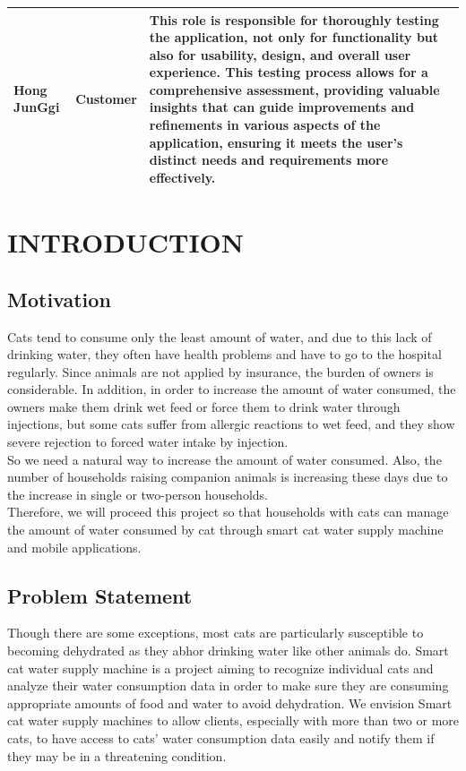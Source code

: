 \documentclass[conference]{IEEEtran}
\begin{document}
\newpage
\begin{table}[htbp!]\normalsize
\begin{center}
\begin{tabular}{|p{1.2cm}|p{1.9cm}|p{4.5cm}|}
\hline
Hong JunGgi & Customer &
This role is responsible for thoroughly testing the application, not only for functionality but also for usability, design, and overall user experience. This testing process allows for a comprehensive assessment, providing valuable insights that can guide improvements and refinements in various aspects of the application, ensuring it meets the user's distinct needs and requirements more effectively.
\\ \hline
\end{tabular}
\label{tab3}
\end{center}
\end{table}

\section{INTRODUCTION}
\subsection{Motivation}


Cats tend to consume only the least amount of water, and due to this lack of drinking water, they often have health problems and have to go to the hospital regularly. Since animals are not applied by insurance, the burden of owners is considerable. In addition, in order to increase the amount of water consumed, the owners make them drink wet feed or force them to drink water through injections, but some cats suffer from allergic reactions to wet feed, and they show severe rejection to forced water intake by injection. \\
So we need a natural way to increase the amount of water consumed. Also, the number of households raising companion animals is increasing these days due to the increase in single or two-person households. \\

Therefore, we will proceed this project so that households with cats can manage the amount of water consumed by cat through smart cat water supply machine and mobile applications. \\

\subsection{Problem Statement}
Though there are some exceptions, most cats are particularly susceptible to becoming dehydrated as they abhor drinking water like other animals do. Smart cat water supply machine is a project aiming to recognize individual cats and analyze their water consumption data in order to make sure they are consuming appropriate amounts of food and water to avoid dehydration. We envision Smart cat water supply machines to allow clients, especially with more than two or more cats, to have access to cats' water consumption data easily and notify them if they may be in a threatening condition. \\
\end{document}
